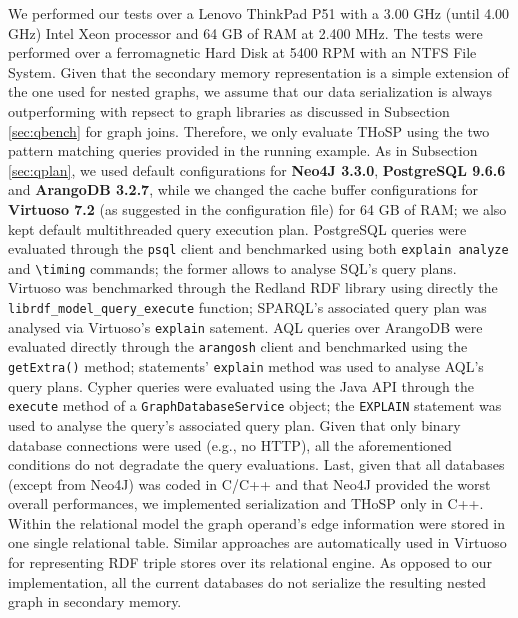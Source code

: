 We performed our tests over a Lenovo ThinkPad P51 with a 3.00 GHz (until 4.00 GHz) Intel Xeon processor and 64 GB of RAM at 2.400 MHz. The tests were performed over a ferromagnetic Hard Disk at 5400 RPM with an NTFS File System. Given that the secondary memory representation is a simple extension of the one used for nested graphs, we assume that our data serialization is always outperforming with repsect to graph libraries as discussed in Subsection \vref{sec:qbench} for graph joins. Therefore, we only evaluate THoSP using the two pattern matching queries provided in the running example. As in Subsection \vref{sec:qplan}, we used default configurations for  \textbf{Neo4J 3.3.0}, \textbf{PostgreSQL 9.6.6} and \textbf{ArangoDB 3.2.7}, while we changed the cache buffer configurations for \textbf{Virtuoso 7.2} (as suggested in the configuration file) for 64 GB of RAM; we also kept  default multithreaded query execution plan.  PostgreSQL queries were evaluated through the \texttt{psql} client and benchmarked using both \texttt{explain analyze} and \texttt{\textbackslash timing} commands; the former   allows to analyse SQL's query plans. Virtuoso was benchmarked through the Redland RDF library using directly the \texttt{librdf\_model\_query\_execute} function; SPARQL's associated query plan was analysed via Virtuoso's \texttt{explain} satement.  
AQL queries over {ArangoDB} were evaluated directly through the \texttt{arangosh} client and benchmarked using the \texttt{getExtra()} method; statements' \texttt{explain} method was used to analyse AQL's query plans. Cypher queries were evaluated using the Java API through the \texttt{execute} method of a \texttt{GraphDatabaseService} object; the \texttt{EX\-PLAIN} statement was used to analyse the query's associated query plan. Given that only binary database connections were used (e.g., no HTTP),
all the aforementioned conditions do not degradate the query evaluations. Last, given that all databases (except from Neo4J) was coded in C/C++ and that Neo4J provided the worst overall performances, we implemented  serialization and THoSP only in C++.
Within the relational model the graph operand's edge information were  stored in one single relational table. Similar approaches are automatically used in Virtuoso for representing RDF triple stores over its relational engine. As opposed to our implementation, all the current databases do not serialize the resulting nested graph in secondary memory.






